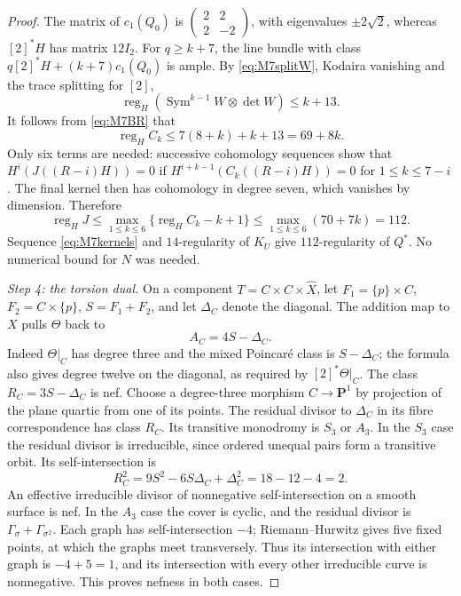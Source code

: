 \documentclass[11pt,a4paper]{article}
\theoremstyle{definition}\newtheorem{definition}[theorem]{Definition}
\theoremstyle{remark}\newtheorem{remark}[theorem]{Remark}
\begin{document}
\begin{proof}
The matrix of $c_1(Q_0)$ is
$\left(\begin{smallmatrix}2&2\\2&-2\end{smallmatrix}\right)$,
with eigenvalues $\pm2\sqrt2$, whereas $[2]^*H$ has matrix $12I_2$.
For $q\ge k+7$, the line bundle with class
$q[2]^*H+(k+7)c_1(Q_0)$ is ample.
By \eqref{eq:M7splitW}, Kodaira vanishing and the trace splitting
for $[2]$,
\[
 \operatorname{reg}_H
   (\operatorname{Sym}^{k-1}W\otimes\det W)\le k+13.
\]
It follows from \eqref{eq:M7BR} that
\[
 \operatorname{reg}_H C_k\le7(8+k)+k+13=69+8k.
\]
Only six terms are needed: successive cohomology sequences show that
$H^i(J((R-i)H))=0$ if
$H^{i+k-1}(C_k((R-i)H))=0$ for $1\le k\le7-i$.
The final kernel then has cohomology in degree seven, which vanishes
by dimension. Therefore
\[
 \operatorname{reg}_H J
 \le\max_{1\le k\le6}\{\operatorname{reg}_H C_k-k+1\}
 \le\max_{1\le k\le6}(70+7k)=112.
\]
Sequence \eqref{eq:M7kernels} and $14$-regularity of $K_U$ give
$112$-regularity of $Q^*$. No numerical bound for $N$ was needed.

\emph{Step 4: the torsion dual.}
On a component $T=C\times C\times\widehat X$, let
$F_1=\{p\}\times C$, $F_2=C\times\{p\}$,
$S=F_1+F_2$, and let $\Delta_C$ denote the diagonal.
The addition map to $X$ pulls $\Theta$ back to
\[
 A_C=4S-\Delta_C.
\]
Indeed $\Theta|_C$ has degree three and the mixed Poincar\'e class
is $S-\Delta_C$; the formula also gives degree twelve on the diagonal,
as required by $[2]^*\Theta|_C$.
The class $R_C=3S-\Delta_C$ is nef. Choose a degree-three morphism
$C\to\mathbf P^1$ by projection of the plane quartic from one of its
points. The residual divisor to $\Delta_C$ in its fibre correspondence
has class $R_C$. Its transitive monodromy is $S_3$ or $A_3$.
In the $S_3$ case the residual divisor is irreducible, since ordered
unequal pairs form a transitive orbit. Its self-intersection is
\[
 R_C^2=9S^2-6S\Delta_C+\Delta_C^2=18-12-4=2.
\]
An effective irreducible divisor of nonnegative self-intersection on a
smooth surface is nef. In the $A_3$ case the cover is cyclic, and the
residual divisor is $\Gamma_\sigma+\Gamma_{\sigma^2}$.
Each graph has self-intersection $-4$; Riemann--Hurwitz gives five
fixed points, at which the graphs meet transversely.
Thus its intersection with either graph is $-4+5=1$, and its
intersection with every other irreducible curve is nonnegative.
This proves nefness in both cases.


\end{proof}
\end{document}

